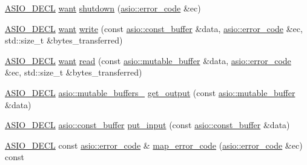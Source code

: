 \begin{DoxyCompactItemize}
\item 
\hyperlink{config_8hpp_ab54d01ea04afeb9a8b39cfac467656b7}{A\+S\+I\+O\+\_\+\+D\+E\+C\+L} \hyperlink{classasio_1_1ssl_1_1detail_1_1engine_ab9812153941a6a93c9095f4e5ca8f915}{want} \hyperlink{classasio_1_1ssl_1_1detail_1_1engine_a88355d3a8bd01482396ad694a47a0bc0}{shutdown} (\hyperlink{classasio_1_1error__code}{asio\+::error\+\_\+code} \&ec)
\item 
\hyperlink{config_8hpp_ab54d01ea04afeb9a8b39cfac467656b7}{A\+S\+I\+O\+\_\+\+D\+E\+C\+L} \hyperlink{classasio_1_1ssl_1_1detail_1_1engine_ab9812153941a6a93c9095f4e5ca8f915}{want} \hyperlink{classasio_1_1ssl_1_1detail_1_1engine_af0ca957749e26f97ff2549c1705e57e2}{write} (const \hyperlink{classasio_1_1const__buffer}{asio\+::const\+\_\+buffer} \&data, \hyperlink{classasio_1_1error__code}{asio\+::error\+\_\+code} \&ec, std\+::size\+\_\+t \&bytes\+\_\+transferred)
\item 
\hyperlink{config_8hpp_ab54d01ea04afeb9a8b39cfac467656b7}{A\+S\+I\+O\+\_\+\+D\+E\+C\+L} \hyperlink{classasio_1_1ssl_1_1detail_1_1engine_ab9812153941a6a93c9095f4e5ca8f915}{want} \hyperlink{classasio_1_1ssl_1_1detail_1_1engine_acc66da794ee5d719b71889f08e3788e7}{read} (const \hyperlink{classasio_1_1mutable__buffer}{asio\+::mutable\+\_\+buffer} \&data, \hyperlink{classasio_1_1error__code}{asio\+::error\+\_\+code} \&ec, std\+::size\+\_\+t \&bytes\+\_\+transferred)
\item 
\hyperlink{config_8hpp_ab54d01ea04afeb9a8b39cfac467656b7}{A\+S\+I\+O\+\_\+\+D\+E\+C\+L} \hyperlink{classasio_1_1mutable__buffers__1}{asio\+::mutable\+\_\+buffers\+\_} \hyperlink{classasio_1_1ssl_1_1detail_1_1engine_aca20901157aad8e5094900afe94c7770}{get\+\_\+output} (const \hyperlink{classasio_1_1mutable__buffer}{asio\+::mutable\+\_\+buffer} \&data)
\item 
\hyperlink{config_8hpp_ab54d01ea04afeb9a8b39cfac467656b7}{A\+S\+I\+O\+\_\+\+D\+E\+C\+L} \hyperlink{classasio_1_1const__buffer}{asio\+::const\+\_\+buffer} \hyperlink{classasio_1_1ssl_1_1detail_1_1engine_ad5f8dbd3628857f365cb8713e9a12eae}{put\+\_\+input} (const \hyperlink{classasio_1_1const__buffer}{asio\+::const\+\_\+buffer} \&data)
\item 
\hyperlink{config_8hpp_ab54d01ea04afeb9a8b39cfac467656b7}{A\+S\+I\+O\+\_\+\+D\+E\+C\+L} const \hyperlink{classasio_1_1error__code}{asio\+::error\+\_\+code} \& \hyperlink{classasio_1_1ssl_1_1detail_1_1engine_acce75a8569a269e71e6067b991cce22b}{map\+\_\+error\+\_\+code} (\hyperlink{classasio_1_1error__code}{asio\+::error\+\_\+code} \&ec) const 
\end{DoxyCompactItemize}


